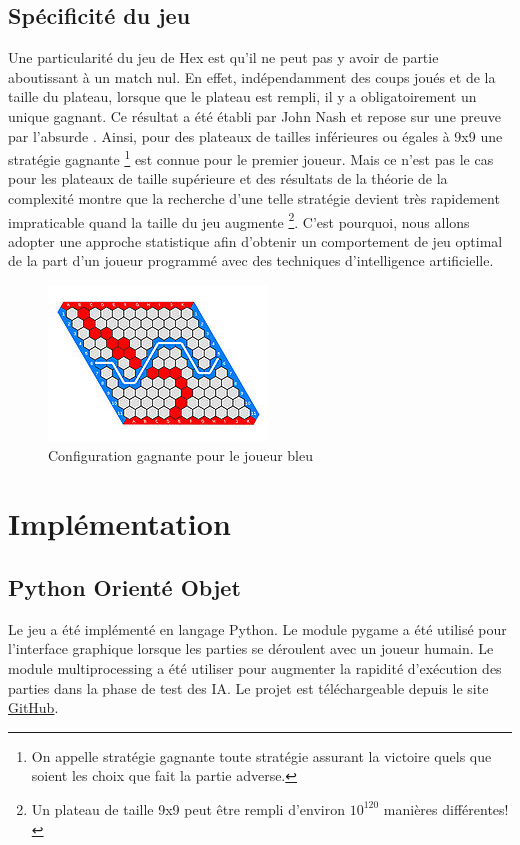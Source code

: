 \documentclass[a4paper]{article}
\theoremstyle{definition}
\begin{document}
\subsection{Spécificité du jeu}

Une particularité du jeu de Hex est qu'il ne peut pas y avoir de partie aboutissant à un match nul. En effet, indépendamment des coups joués et de la taille du plateau, lorsque que le plateau est rempli, il y a obligatoirement un unique gagnant. Ce résultat a été établi par John Nash et repose sur une preuve par l'absurde \cite{preuvewiki}.
Ainsi, pour des plateaux de tailles inférieures ou égales à 9x9 une stratégie gagnante \footnote{On appelle stratégie gagnante toute stratégie assurant la victoire quels que soient les choix que fait la partie adverse.} est connue pour le premier joueur. Mais ce n'est pas le cas pour les plateaux de taille supérieure et des résultats de la théorie de la complexité montre que la recherche d'une telle stratégie devient très rapidement impraticable quand la taille du jeu augmente \footnote{Un plateau de taille 9x9 peut être rempli d'environ $10^{120}$ manières différentes!}. C'est pourquoi, nous allons adopter une approche statistique afin d'obtenir un comportement de jeu optimal de la part d'un joueur programmé avec des techniques d'intelligence artificielle.

\begin{figure}[h]
	\centering
	\includegraphics[scale=1]{11x11_gagnant.jpg}
	\caption{Configuration gagnante pour le joueur bleu}
\end{figure}

\section{Implémentation}

\subsection{Python Orienté Objet}

Le jeu a été implémenté en langage Python. Le module pygame a été utilisé pour l'interface graphique lorsque les parties se déroulent avec un joueur humain. Le module multiprocessing a été utiliser pour augmenter la rapidité d'exécution des parties dans la phase de test des IA. Le projet est téléchargeable depuis le site \href{https://github.com/Maxime-LP/Hex-Game}{GitHub}.\\
\end{document}
